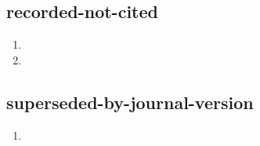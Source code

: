 \documentclass{article}
\begin{document}
\subsection{recorded-not-cited}
\begin{enumerate}
\item {}
\item {}
\end{enumerate}

\subsection{superseded-by-journal-version}
\begin{enumerate}
\item {}
\end{enumerate}
\end{document}

